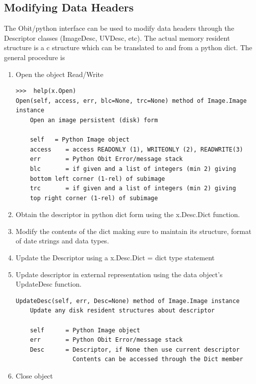 \documentclass[11pt]{report}
\begin{document}
\subsection{Modifying Data Headers}
The Obit/python interface can be used to modify data headers through
the Descriptor classes (ImageDesc, UVDesc, etc).  
The actual memory resident structure is a c structure which can be
translated to and from a python dict.
The general procedure is 
\begin{enumerate}
\item Open the object Read/Write
\begin{verbatim}
>>>  help(x.Open)
Open(self, access, err, blc=None, trc=None) method of Image.Image instance
    Open an image persistent (disk) form
    
    self   = Python Image object
    access    = access READONLY (1), WRITEONLY (2), READWRITE(3)
    err       = Python Obit Error/message stack
    blc       = if given and a list of integers (min 2) giving
    bottom left corner (1-rel) of subimage
    trc       = if given and a list of integers (min 2) giving
    top right corner (1-rel) of subimage
\end{verbatim}
\item Obtain the descriptor in python dict form using the x.Desc.Dict
function.
\item Modify the contents of the dict making sure to maintain its
structure, format of date strings and data types.
\item Update the Descriptor using a x.Desc.Dict = dict type statement
\item Update descriptor in external representation using the data
  object's UpdateDesc function.
\begin{verbatim}
UpdateDesc(self, err, Desc=None) method of Image.Image instance
    Update any disk resident structures about descriptor
    
    self      = Python Image object
    err       = Python Obit Error/message stack
    Desc      = Descriptor, if None then use current descriptor
                Contents can be accessed through the Dict member
\end{verbatim}
\item Close object
\end{enumerate}
\end{document}
